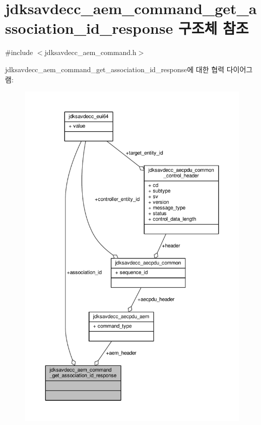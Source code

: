 \hypertarget{structjdksavdecc__aem__command__get__association__id__response}{}\section{jdksavdecc\+\_\+aem\+\_\+command\+\_\+get\+\_\+association\+\_\+id\+\_\+response 구조체 참조}
\label{structjdksavdecc__aem__command__get__association__id__response}


{\ttfamily \#include $<$jdksavdecc\+\_\+aem\+\_\+command.\+h$>$}



jdksavdecc\+\_\+aem\+\_\+command\+\_\+get\+\_\+association\+\_\+id\+\_\+response에 대한 협력 다이어그램\+:
\nopagebreak
\begin{figure}[H]
\begin{center}
\leavevmode
\includegraphics[width=350pt]{structjdksavdecc__aem__command__get__association__id__response__coll__graph}
\end{center}
\end{figure}
